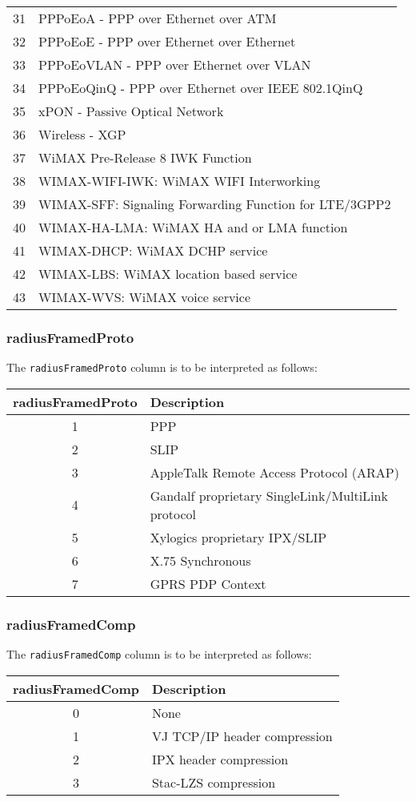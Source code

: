 \documentclass[documentation]{subfiles}
\begin{document}
\begin{longtable}{rl}
    31 & PPPoEoA - PPP over Ethernet over ATM\\
    32 & PPPoEoE - PPP over Ethernet over Ethernet\\
    33 & PPPoEoVLAN - PPP over Ethernet over VLAN\\
    34 & PPPoEoQinQ - PPP over Ethernet over IEEE 802.1QinQ\\
    35 & xPON - Passive Optical Network\\
    36 & Wireless - XGP\\
    37 & WiMAX Pre-Release 8 IWK Function\\
    38 & WIMAX-WIFI-IWK: WiMAX WIFI Interworking\\
    39 & WIMAX-SFF: Signaling Forwarding Function for LTE/3GPP2\\
    40 & WIMAX-HA-LMA: WiMAX HA and or LMA function\\
    41 & WIMAX-DHCP: WiMAX DCHP service\\
    42 & WIMAX-LBS: WiMAX location based service\\
    43 & WIMAX-WVS: WiMAX voice service\\
    \bottomrule
\end{longtable}

\subsubsection{radiusFramedProto}\label{radiusFramedProto}
The {\tt radiusFramedProto} column is to be interpreted as follows:
\begin{longtable}{cl}
    \toprule
    {\bf radiusFramedProto} & {\bf Description}\\
    \midrule\endhead%
    1 & PPP\\
    2 & SLIP\\
    3 & AppleTalk Remote Access Protocol (ARAP)\\
    4 & Gandalf proprietary SingleLink/MultiLink protocol\\
    5 & Xylogics proprietary IPX/SLIP\\
    6 & X.75 Synchronous\\
    7 & GPRS PDP Context\\
    \bottomrule
\end{longtable}

\subsubsection{radiusFramedComp}\label{radiusFramedComp}
The {\tt radiusFramedComp} column is to be interpreted as follows:
\begin{longtable}{cl}
    \toprule
    {\bf radiusFramedComp} & {\bf Description}\\
    \midrule\endhead%
    0 & None\\
    1 & VJ TCP/IP header compression\\
    2 & IPX header compression\\
    3 & Stac-LZS compression\\
    \bottomrule
\end{longtable}
\end{document}
